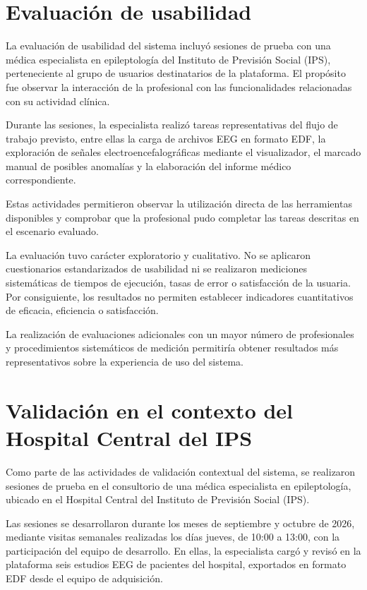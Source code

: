 \section{Evaluación de usabilidad}

La evaluación de usabilidad del sistema incluyó sesiones de prueba con una médica especialista en epileptología del Instituto de Previsión Social (IPS), perteneciente al grupo de usuarios destinatarios de la plataforma. El propósito fue observar la interacción de la profesional con las funcionalidades relacionadas con su actividad clínica.

Durante las sesiones, la especialista realizó tareas representativas del flujo de trabajo previsto, entre ellas la carga de archivos EEG en formato EDF, la exploración de señales electroencefalográficas mediante el visualizador, el marcado manual de posibles anomalías y la elaboración del informe médico correspondiente.

Estas actividades permitieron observar la utilización directa de las herramientas disponibles y comprobar que la profesional pudo completar las tareas descritas en el escenario evaluado.

La evaluación tuvo carácter exploratorio y cualitativo. No se aplicaron cuestionarios estandarizados de usabilidad ni se realizaron mediciones sistemáticas de tiempos de ejecución, tasas de error o satisfacción de la usuaria. Por consiguiente, los resultados no permiten establecer indicadores cuantitativos de eficacia, eficiencia o satisfacción.

La realización de evaluaciones adicionales con un mayor número de profesionales y procedimientos sistemáticos de medición permitiría obtener resultados más representativos sobre la experiencia de uso del sistema.

\section{Validación en el contexto del Hospital Central del IPS}

Como parte de las actividades de validación contextual del sistema, se realizaron sesiones de prueba en el consultorio de una médica especialista en epileptología, ubicado en el Hospital Central del Instituto de Previsión Social (IPS).

Las sesiones se desarrollaron durante los meses de septiembre y octubre de 2026, mediante visitas semanales realizadas los días jueves, de 10:00 a 13:00, con la participación del equipo de desarrollo.
En ellas, la especialista cargó y revisó en la plataforma seis estudios EEG de pacientes del hospital, exportados en formato EDF desde el equipo de adquisición.

